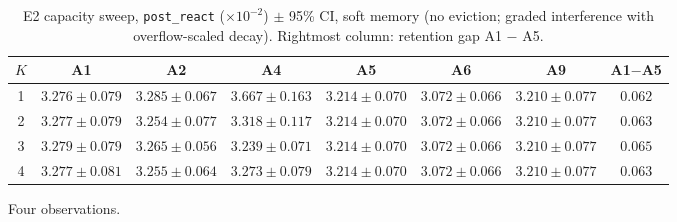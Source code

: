 \documentclass[11pt,a4paper]{article}
\theoremstyle{definition}
\theoremstyle{plain}
\begin{document}
\begin{table}[h]
\centering
\caption{E2 capacity sweep, \texttt{post\_react} ($\times 10^{-2}$) $\pm$
95\% CI, soft memory (no eviction; graded interference with
overflow-scaled decay). Rightmost column: retention gap A1 $-$ A5.}
\label{tab:dd5-e2-soft}
\small
\begin{tabular}{cccccccc}
\toprule
$K$ & A1 & A2 & A4 & A5 & A6 & A9 & A1$-$A5 \\
\midrule
1 & $3.276 \pm 0.079$ & $3.285 \pm 0.067$ & $3.667 \pm 0.163$ & $3.214 \pm 0.070$ & $3.072 \pm 0.066$ & $3.210 \pm 0.077$ & $0.062$ \\
2 & $3.277 \pm 0.079$ & $3.254 \pm 0.077$ & $3.318 \pm 0.117$ & $3.214 \pm 0.070$ & $3.072 \pm 0.066$ & $3.210 \pm 0.077$ & $0.063$ \\
3 & $3.279 \pm 0.079$ & $3.265 \pm 0.056$ & $3.239 \pm 0.071$ & $3.214 \pm 0.070$ & $3.072 \pm 0.066$ & $3.210 \pm 0.077$ & $0.065$ \\
4 & $3.277 \pm 0.081$ & $3.255 \pm 0.064$ & $3.273 \pm 0.079$ & $3.214 \pm 0.070$ & $3.072 \pm 0.066$ & $3.210 \pm 0.077$ & $0.063$ \\
\bottomrule
\end{tabular}
\end{table}

Four observations.
\end{document}
